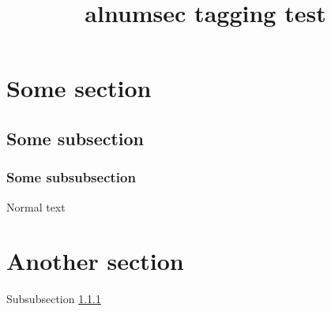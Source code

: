 \documentclass{article}
\title{alnumsec tagging test}
\begin{document}
\tableofcontents

\section{Some section}
\subsection{Some subsection}
\subsubsection{Some subsubsection}\label{sssec}
Normal text
\section{Another section}

Subsubsection \ref{sssec}
\end{document}

